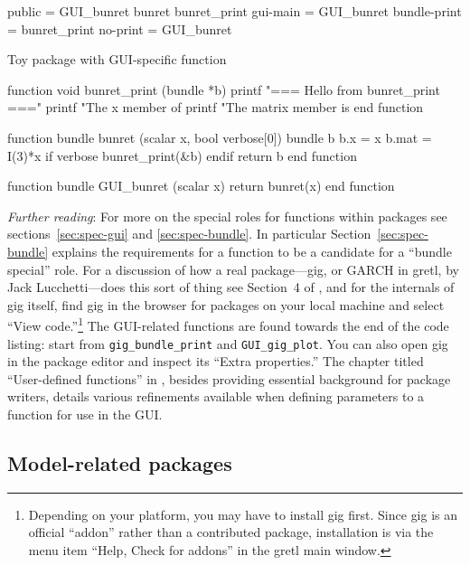 \documentclass[oneside]{book}
\begin{document}
\begin{code}
public = GUI_bunret bunret bunret_print
gui-main = GUI_bunret
bundle-print = bunret_print
no-print = GUI_bunret
\end{code}

\begin{script}[htbp]
\caption{Toy package with GUI-specific function}
\label{ex:bunret}
\begin{scode}
function void bunret_print (bundle *b)
  printf "=== Hello from bunret_print ===\n\n"
  printf "The x member of %
  printf "The matrix member is\n\n%
end function

function bundle bunret (scalar x, bool verbose[0])
  bundle b
  b.x = x
  b.mat = I(3)*x
  if verbose
    bunret_print(&b)
  endif
  return b
end function

function bundle GUI_bunret (scalar x)
  return bunret(x)
end function
\end{scode}
\end{script}

\textit{Further reading}: For more on the special roles for functions
within packages see sections~\ref{sec:spec-gui} and
\ref{sec:spec-bundle}. In particular Section~\ref{sec:spec-bundle}
explains the requirements for a function to be a candidate for a
``bundle special'' role. For a discussion of how a real
package---\textsf{gig}, or GARCH in gretl, by Jack Lucchetti---does
this sort of thing see Section~4 of \cite{addons-bundles}, and for the
internals of \textsf{gig} itself, find \textsf{gig} in the browser for
packages on your local machine and select ``View
code.''\footnote{Depending on your platform, you may have to install
  gig first. Since \textsf{gig} is an official ``addon'' rather than a
  contributed package, installation is via the menu item ``Help, Check
  for addons'' in the gretl main window.} The GUI-related functions
are found towards the end of the code listing: start from
\texttt{gig\_bundle\_print} and \texttt{GUI\_gig\_plot}. You can also
open \textsf{gig} in the package editor and inspect its ``Extra
properties.'' The chapter titled ``User-defined functions'' in
\cite{GUG}, besides providing essential background for package
writers, details various refinements available when defining
parameters to a function for use in the GUI.

\subsection{Model-related packages}
\end{document}
